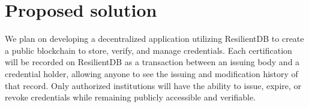 \section{Proposed solution}

We plan on developing a decentralized application utilizing ResilientDB to create a public blockchain to store, verify, and manage credentials. Each certification will be recorded on ResilientDB as a transaction between an issuing body and a credential holder, allowing anyone to see the issuing and modification history of that record. Only authorized institutions will have the ability to issue, expire, or revoke credentials while remaining publicly accessible and verifiable.
